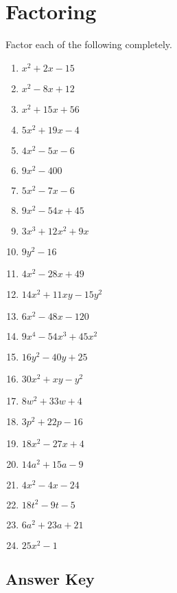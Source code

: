 \chapter{Factoring}

Factor each of the following completely.

\begin{multicols}{4}
\begin{enumerate}
\item $x^2 + 2x - 15$
\item $x^2 - 8x + 12$
\item $x^2 + 15x + 56$
\item $5x^2 + 19x - 4$
\item $4x^2 - 5x - 6$
\item $9x^2 - 400$
\item $5x^2-7x-6$
\item $9x^2-54x+45$
\item $3x^3+12x^2+9x$
\item $9y^2-16$
\item $4x^2-28x+49$
\item $14x^2+11xy-15y^2$
\item $6x^2-48x-120$
\item $9x^4-54x^3+45x^2$
\item $16y^2-40y+25$
\item $30x^2+xy-y^2$
\item $8w^2 + 33w + 4$
\item $3p^2+22p-16$
\item $18x^2-27x+4$
\item $14a^2+15a-9$
\item $4x^2-4x-24$
\item $18t^2-9t-5$
\item $6a^2 + 23a + 21$
\item $25x^2-1$
\end{enumerate}
\end{multicols}

\newpage

\section{Answer Key}

